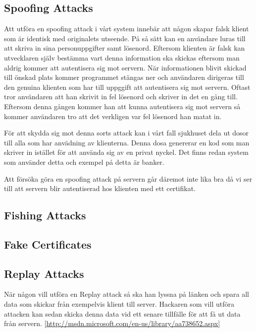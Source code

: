 \subsection{Spoofing Attacks}

Att utföra en spoofing attack i vårt system innebär att någon skapar falsk klient som är identisk med originalets utseende. På så sätt kan en användare luras till att skriva in sina personuppgifter samt lösenord. Eftersom klienten är falsk kan utvecklaren själv bestämma vart denna information ska skickas eftersom man aldrig kommer att autentisera sig mot servern. När informationen blivit skickad till önskad plats kommer programmet stängas ner och användaren dirigeras till den genuina klienten som har till uppggift att autentisera sig mot servern. Oftast tror användaren att han skrivit in fel lösenord och skriver in det en gång till. Eftersom denna gången kommer han att kunna autentisera sig mot servern så kommer användaren tro att det verkligen var fel lösenord han matat in. 

För att skydda sig mot denna sorts attack kan i vårt fall sjukhuset dela ut dosor till alla som har anvädning av klienterna. Denna dosa genererar en kod som man skriver in istället för att använda sig av en privat nyckel. Det finns redan system som använder detta och exempel på detta är banker. 

Att försöka göra en spoofing attack på servern går däremot inte lika bra då vi ser till att servern blir autentiserad hos klienten med ett certifikat.

\subsection{Fishing Attacks}



\subsection{Fake Certificates}



\subsection{Replay Attacks}


När någon vill utföra en Replay attack så ska han lyssna på länken och spara all data som skickar från exempelvis klient till server. Hackaren som vill utföra attacken kan sedan skicka denna data vid ett senare tillfälle för att få ut data från servern. [\url{http://msdn.microsoft.com/en-us/library/aa738652.aspx}]

